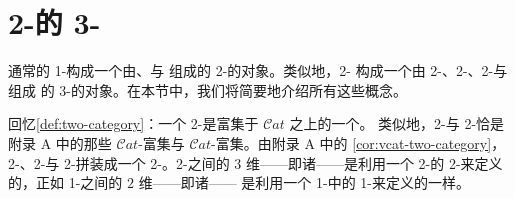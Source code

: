 
\providecommand{\Cat}{\mathcal{C}at}
\providecommand{\hTwoCell}[5]{\tikz[baseline=-0.8ex]{%
  \node (rvl) at (0,0) {$#1$};
  \node (rvr) at (2.9,0) {$#2$};
  \draw[->] (rvl) to[bend left=28] node[above]{$\scriptstyle #3$} (rvr);
  \draw[->] (rvl) to[bend right=28] node[below]{$\scriptstyle #5$} (rvr);
  \node at (1.45,0) {$\scriptstyle #4$};}}

\section{2-\trCategory{}的 3-\trCategory}\label{sec:the-3-category-of-2-categories}

通常的 1-\trCategory{}构成一个由\trCategory、\trFunctor{}与%
\trNaturalTransformation{}组成的 2-\trCategory{}的对象。类似地，2-\trCategory{}%
构成一个由 2-\trCategory、2-\trFunctor、2-\trNaturalTransformation{}与\trModification{}组成
的 3-\trCategory{}的对象。在本节中，我们将简要地介绍所有这些概念。

回忆\cref{def:two-category}：一个 2-\trCategory{}是富集于 $\Cat$ 之上的一个\trCategory。
类似地，2-\trFunctor{}与 2-\trNaturalTransformation{}恰是附录 A 中的那些
$\Cat$-富集\trFunctor{}与 $\Cat$-富集\trNaturalTransformation。由附录 A 中的%
\cref{cor:vcat-two-category}，2-\trCategory、2-\trFunctor{}与
2-\trNaturalTransformation{}拼装成一个 2-\trCategory。2-\trCategory{}之间的
$3$ 维\trCell{}——即诸\trModification{}——是利用一个 2-\trCategory{}的 2-\trCell{}来定义
的，正如 1-\trCategory{}之间的 $2$ 维\trCell{}——即诸\trNaturalTransformation{}——%
是利用一个 1-\trCategory{}中的 1-\trCell{}来定义的一样。

